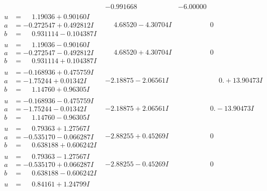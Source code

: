 \documentclass[1p]{elsarticle_modified}
\theoremstyle{definition}
\begin{document}
$$\begin{array}{c|c|c}
 & -0.991668\phantom{ +0.000000I} & -6.00000\phantom{ +0.000000I} \\ \hline\begin{aligned}
u &= \phantom{-}1.19036 + 0.90160 I \\
a &= -0.272547 + 0.492812 I \\
b &= \phantom{-}0.931114 - 0.104387 I\end{aligned}
 & \phantom{-}4.68520 - 4.30704 I & \phantom{-0.000000 } 0 \\ \hline\begin{aligned}
u &= \phantom{-}1.19036 - 0.90160 I \\
a &= -0.272547 - 0.492812 I \\
b &= \phantom{-}0.931114 + 0.104387 I\end{aligned}
 & \phantom{-}4.68520 + 4.30704 I & \phantom{-0.000000 } 0 \\ \hline\begin{aligned}
u &= -0.168936 + 0.475759 I \\
a &= -1.75244 + 0.01342 I \\
b &= \phantom{-}1.14760 + 0.96305 I\end{aligned}
 & -2.18875 - 2.06561 I & \phantom{-0.000000 -}0. + 13.90473 I \\ \hline\begin{aligned}
u &= -0.168936 - 0.475759 I \\
a &= -1.75244 - 0.01342 I \\
b &= \phantom{-}1.14760 - 0.96305 I\end{aligned}
 & -2.18875 + 2.06561 I & \phantom{-0.000000 } 0. - 13.90473 I \\ \hline\begin{aligned}
u &= \phantom{-}0.79363 + 1.27567 I \\
a &= -0.535170 - 0.066287 I \\
b &= \phantom{-}0.638188 + 0.606242 I\end{aligned}
 & -2.88255 + 0.45269 I & \phantom{-0.000000 } 0 \\ \hline\begin{aligned}
u &= \phantom{-}0.79363 - 1.27567 I \\
a &= -0.535170 + 0.066287 I \\
b &= \phantom{-}0.638188 - 0.606242 I\end{aligned}
 & -2.88255 - 0.45269 I & \phantom{-0.000000 } 0 \\ \hline\begin{aligned}
u &= \phantom{-}0.84161 + 1.24799 I \\

\end{aligned}
\end{array}$$
\end{document}
